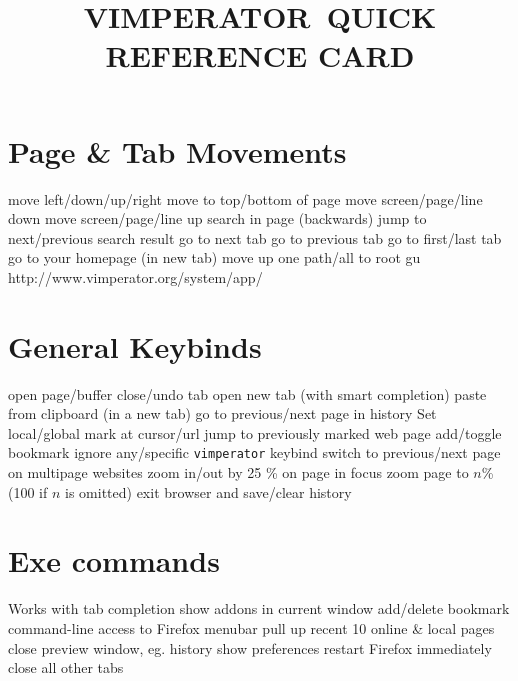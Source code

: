 
\def\content{VIMPERATOR}
\def\versionnumber{1.2}  %

\def\version{v\versionnumber\ \month\ \year}




\title{\uppercase{\content\ quick reference card}}

\shortintro

\vskip 0.5cm

\section{Page \& Tab Movements}{}
	{move left/down/up/right}
	{move to top/bottom of page}
	{move screen/page/line down}
	{move screen/page/line up}
	{search in page (backwards)}
	{jump to next/previous search result}
	{go to next tab}
	{go to previous tab}
	{go to first/last tab}
	{go to your homepage (in new tab)}
	{move up one path/all to root}
	{gu http://www.vimperator.org/system/app/}

\section{General Keybinds}{}
	{open page/buffer}
	{close/undo tab}
	{open new tab (with smart completion)}
	{paste from clipboard (in a new tab)}
	{go to previous/next page in history}
	{Set local/global mark at cursor/url}
	{jump to previously marked web page}
	{add/toggle bookmark}
	{ignore any/specific {\tt vimperator} keybind}
\cmdS{\lbracket\lbracket~\rbracket\rbracket}	{switch to previous/next page on multipage websites}
\cmdS{+~-}	{zoom in/out by 25 \% on page in focus}
	{zoom page to $n$\% (100 if $n$ is omitted)}
	{exit browser and save/clear history}
%
\\
%
\section{Exe commands}{Works with tab completion}
	{show addons in current window}
	{add/delete bookmark}
	{command-line access to Firefox menubar}
	{pull up recent 10 online \& local pages}
	{close preview window, eg. history}
	{show preferences}
	{restart Firefox immediately}
	{close all other tabs}

